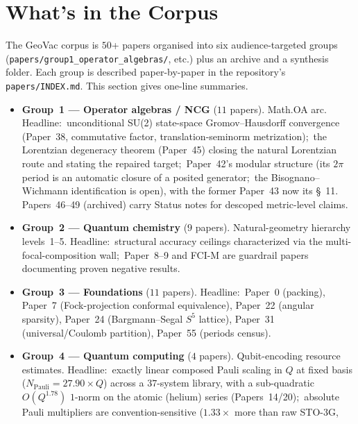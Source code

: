 \documentclass[11pt,a4paper]{article}
\newcommand{\sfive}{S^{5}}
\newcommand{\gvc}[2]{#2}
\begin{document}
\section{What's in the Corpus}
\label{sec:corpus}

The GeoVac corpus is $50$+ papers organised into six audience-targeted
groups (\texttt{papers/group1\_operator\_algebras/}, etc.) plus an
archive and a synthesis folder.  Each group is described
paper-by-paper in the repository's \texttt{papers/INDEX.md}.  This
section gives one-line summaries.

\begin{itemize}
  \item \textbf{Group~1 --- Operator algebras / NCG} ($11$ papers).
    Math.OA arc.  Headline:\ \gvc{wh1-p38-gh-convergence}{unconditional SU(2) state-space Gromov--Hausdorff convergence (Paper~38, commutative factor, translation-seminorm metrization)};\ the Lorentzian degeneracy theorem
    (Paper~45) closing the natural Lorentzian route and stating the
    repaired target;\ Paper~42's modular structure (its $2\pi$ period is
    an automatic closure of a posited generator;\ the
    Bisognano--Wichmann identification is open), with the former
    Paper~43 now its \S~11.  Papers~46--49 (archived) carry Status
    notes for descoped metric-level claims.
  \item \textbf{Group~2 --- Quantum chemistry} ($9$ papers).
    Natural-geometry hierarchy levels~1--5.  Headline:\ structural
    accuracy ceilings characterized via the multi-focal-composition
    wall;\ Paper~8--9 and FCI-M are guardrail papers documenting
    proven negative results.
  \item \textbf{Group~3 --- Foundations} ($11$ papers).
    Headline:\ Paper~0 (packing), Paper~7
    (Fock-projection conformal equivalence), Paper~22 (angular
    sparsity), Paper~24 (Bargmann--Segal $\sfive$ lattice), Paper~31
    (universal/Coulomb partition), Paper~55 (periods census).
  \item \textbf{Group~4 --- Quantum computing} ($4$ papers).
    Qubit-encoding resource estimates.  Headline:\ exactly linear
    composed Pauli scaling in $Q$ at fixed basis
    ($N_{\mathrm{Pauli}} = 27.90 \times Q$) across a $37$-system library,
    with a sub-quadratic $O(Q^{1.78})$ $1$-norm on the atomic (helium)
    series (Papers~14/20);\ absolute Pauli
    multipliers are convention-sensitive ($1.33\times$ more than raw STO-3G,

\end{itemize}
\end{document}
